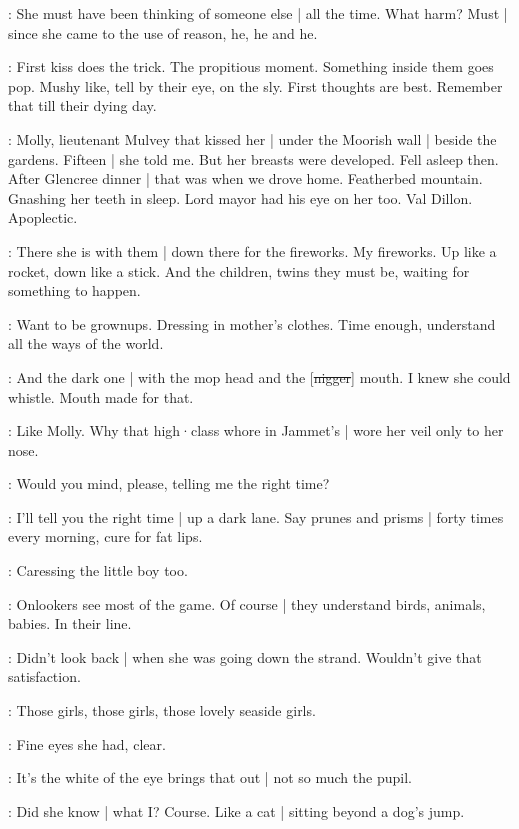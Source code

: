 \BloomCurrent:
She must have been thinking of someone else |
all the time.
What harm?
Must |
since she came to the use of reason,
he,
he and he.

\BloomAbstract:
First kiss does the trick.
The propitious moment.
Something inside them goes pop.
Mushy like,
tell by their eye,
on the sly.
First thoughts are best.
Remember that
till their dying day.

\BloomHist:
Molly,
lieutenant Mulvey that kissed her |
under the Moorish wall |
beside the gardens.%
Fifteen |
she told me.
But her breasts were developed.
Fell asleep then.
After Glencree dinner |
that was when we drove home.
Featherbed mountain.
Gnashing her teeth in sleep.
Lord mayor had his eye on her too.
Val Dillon.
Apoplectic.

\BloomCurrent:
There she is with them |
down there for the fireworks.
My fireworks.
Up like a rocket,
down like a stick.
And the children,
twins they must be,
waiting for something to happen.

\BloomAbstract:
Want to be grownups.
Dressing in mother's clothes.
Time enough,
understand all the ways of the world.

\BloomCurrent:
And the dark one |
with the mop head
and the [\sout{nigger}] mouth.
I knew she could whistle.
Mouth made for that.

\BloomHist:
Like Molly.
Why that high·class whore in Jammet's |
wore her veil
only to her nose.%

\BloomOther:
Would you mind,
please,
telling me the right time?

\BloomAbstract:
I'll tell you the right time |
up a dark lane.
Say prunes and prisms |
forty times every morning,
cure for fat lips.

\BloomCurrent:
Caressing the little boy too.

\BloomAbstract:
Onlookers see most of the game.
Of course |
they understand birds,
animals,
babies.
In their line.

\BloomCurrent:
Didn't look back |
when she was going down the strand.
Wouldn't give that satisfaction.

\BloomHist:
Those girls,
those girls,
those lovely seaside girls.

\BloomCurrent:
Fine eyes she had,
clear.

\BloomAbstract:
It's the white of the eye brings that out |
not so much the pupil.

\BloomCurrent:
Did she know |
what I?
Course.
Like a cat |
sitting beyond a dog's jump.

